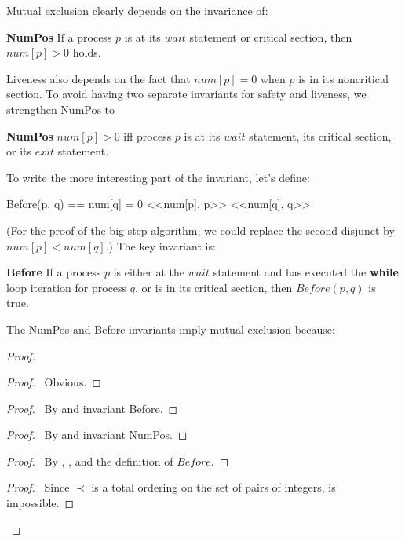 \documentclass[fleqn,leqno]{article}
\begin{document}
Mutual exclusion clearly depends on the invariance of:
\begin{display}
\textbf{NumPos } If a process $p$ is at its $wait$ statement or
critical section, then $num[p]>0$ holds.
\end{display}
Liveness also depends on the fact that $num[p]=0$ when $p$ is in its
noncritical section.  To avoid having two separate invariants for
safety and liveness, we strengthen NumPos to
\begin{display}
\textbf{NumPos } $num[p]>0$ iff process $p$ is at its $wait$
statement, its critical section, or its $exit$ statement.
\end{display}
To write the more interesting part of the invariant, let's define:
\begin{display}
\begin{notla}
Before(p, q) == \/ num[q] = 0
                \/ <<num[p], p>> \prec <<num[q], q>>
\end{notla}
\begin{tlatex}
%
\end{tlatex}
\end{display}
(For the proof of the big-step algorithm, we could replace the second
disjunct by $num[p]<num[q]$.)  The key invariant is:
\begin{display}
\textbf{Before } If a process $p$ is either at the $wait$
statement and has executed the \textbf{while} loop iteration for
process $q$, or is in its critical section, then $Before(p, q)$ is
true.
\end{display}
The NumPos and Before invariants imply mutual exclusion because:
\begin{display}
\pflongindent
\pflongnumbers
\beforePfSpace{0pt}
\afterPfSpace{0pt, .3em}
\interStepSpace{.5em}
\begin{proof}
\begin{proof}
\pf\ Obvious.
\end{proof}
\begin{proof}
\pf\ By  and invariant Before.
\end{proof}

\begin{proof}
\pf\ By  and invariant NumPos.
\end{proof}

\begin{proof}
\pf\ By , , and the definition of $Before$.
\end{proof}

\qedstep
\begin{proof}
\pf\ Since $\prec$ is a total ordering on the set of pairs
of integers,  is impossible.
\end{proof}
\end{proof}
\end{display}
\end{document}
